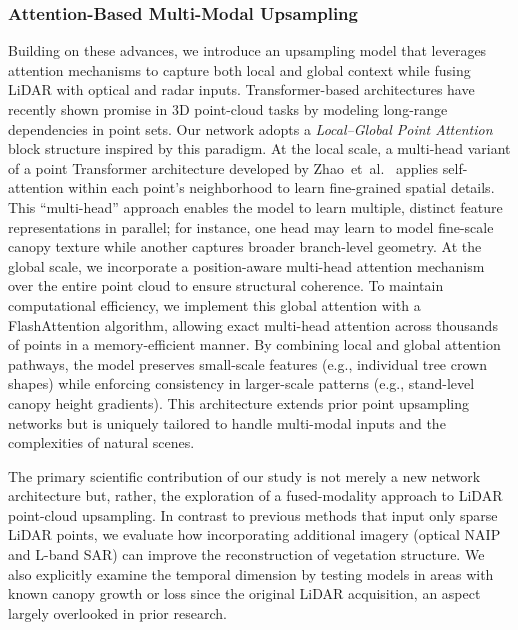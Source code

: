 \documentclass[12pt]{report}
\begin{document}
\subsubsection*{Attention-Based
 Multi-Modal Upsampling}

Building on these advances, we introduce an upsampling model that leverages attention mechanisms to capture both local and global context while fusing LiDAR with optical and radar inputs. Transformer-based architectures have recently shown promise in 3D point-cloud tasks by modeling long-range dependencies in point sets. Our network adopts a \emph{Local--Global Point Attention} block structure inspired by this paradigm. At the local scale, a multi-head variant of a point Transformer architecture developed by \mbox{Zhao et al. \cite{zhao2021point}} applies self-attention within each point’s neighborhood to learn fine-grained spatial details. This “multi-head” approach enables the model to learn multiple, distinct feature representations in parallel; for instance, one head may learn to model fine-scale canopy texture while another captures broader branch-level geometry. At the global scale, we incorporate a position-aware multi-head attention mechanism over the entire point cloud to ensure structural coherence. To maintain computational efficiency, we implement this global attention with a FlashAttention \cite{dao2022flashattention} algorithm, allowing exact multi-head attention across thousands of points in a memory-efficient manner. By combining local and global attention pathways, the model preserves small-scale features (e.g., individual tree crown shapes) while enforcing consistency in larger-scale patterns (e.g., stand-level canopy height gradients). This architecture extends prior point upsampling networks but is uniquely tailored to handle multi-modal inputs and the complexities of natural scenes.

The primary scientific contribution of our study is not merely a new network architecture but, rather, the exploration of a fused-modality approach to LiDAR point-cloud upsampling. In contrast to previous methods that input only sparse LiDAR points, we evaluate how incorporating additional imagery (optical NAIP and L-band SAR) can improve the reconstruction of vegetation structure. We also explicitly examine the temporal dimension by testing models in areas with known canopy growth or loss since the original LiDAR acquisition, an aspect largely overlooked in prior research.
\end{document}
